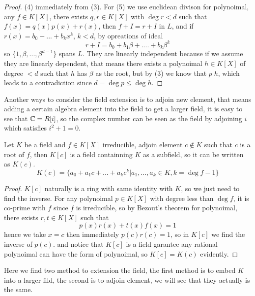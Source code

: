 \documentclass[en,geye,blue,normal,12pt]{elegantnote}
\begin{document}
\begin{proposition}
\begin{proof}
    (4) immediately from (3). For (5) we use euclidean divison for polynoimal, any \(f \in K[X]\), there exists \(q ,r \in K[X]\) with \(\deg r < d\) such that \( f(x) = q(x)p(x)+r(x)\), then \(f+ I = r + I\) in \(L\), and if \(r(x) = b_0+...+b_kx^k\), \(k < d\), by opreations of ideal
    \[r+I = b_0 + b_1\beta+....+ b_k\beta^k\]
    so \(\{1,\beta,...,\beta^{d-1}\} \) spans \(L\). They are linearly independent because if we assume they are linearly dependent, that means there exists a polynoimal \(h \in K[X]\) of degree \(< d\) such that \(h\) has \(\beta\) as the root, but by (3) we know that \(p | h\), which leads to a contradiction since \(d= \deg p \leq \deg h \).
  \end{proof}

\end{proposition}
Another ways to consider the field extension is to adjoin new element, that means adding a certain algebra element into the field to get a larger field, it is easy to see that \(\mathbb{C} = R[i]\), so the complex number can be seen as the field by adjoining \(i\) which satisfies \(i^2+1 = 0\).

\begin{proposition}
  Let \(K\) be a field and \(f \in K[X]\) irreducible, adjoin element \(c \notin K\) such that \(c\) is a root of \(f\), then \(K[c]\) is a field containning \(K\) as a subfield, so it can be written as \(K(c)\).
  \[K(c) = \{a_0+a_1c+...+a_kc^k| a_1,...,a_k \in K, k= \deg f-1\}\]
  \begin{proof}
    \(K[c]\) naturally is a ring with same identity with \(K\), so we just need to find the inverse. For any polynoimal \(p \in K[X]\) with degree less than \(\deg f\), it is co-prime with \(f\) since \(f\) is irreducible, so by Bezout's theorem for polynoimal, there exists \(r, t \in K[X]\) such that 
    \[p(x)r(x)+t(x)f(x) = 1\]
    hence we take \(x = c\) then immediately \(p(c)r(c) = 1\), so in \(K[c]\) we find the inverse of \(p(c)\). and notice that \(K[c]\) is a field garantee any rational polynoimal can have the form of polynoimal, so \(K[c] = K(c)\) evidently.
  \end{proof}
\end{proposition}

Here we find two method to extension the field, the first method is to embed \(K\) into a larger fild, the second is to adjoin element, we will see that they actually is the same.
\end{document}
